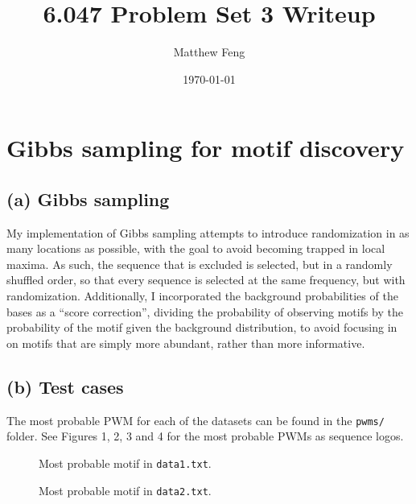 \documentclass[11pt]{article}
\title{6.047 Problem Set 3 Writeup}
\author{Matthew Feng}
\date{\today}
\begin{document}
\maketitle

\section{Gibbs sampling for motif discovery}
\subsection*{(a) Gibbs sampling}
My implementation of Gibbs sampling attempts to introduce
randomization in as many locations as possible, with the
goal to avoid becoming trapped in local maxima. As such,
the sequence that is excluded is selected, but in
a randomly shuffled order, so that every sequence is
selected at the same frequency, but with randomization.
Additionally, I incorporated the background probabilities of
the bases as a ``score correction'', dividing the probability
of observing motifs by the probability of the motif given the
background distribution, to avoid focusing
in on motifs that are simply more abundant, rather than
more informative.

\subsection*{(b) Test cases}

The most probable PWM for each of the datasets can be found in
the {\tt pwms/} folder. See Figures 1, 2, 3 and 4 for the most
probable PWMs as sequence logos.

\begin{figure}
\noindent{}
\caption{Most probable motif in {\tt data1.txt}.}
\end{figure}

\begin{figure}
\noindent{}
\caption{Most probable motif in {\tt data2.txt}.}
\end{figure}
\end{document}
